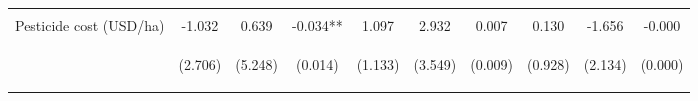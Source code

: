 \begin{center}
\begin{tabular}{lccccccccc}
\vspace{4pt} & \begin{footnotesize}[0.231]\end{footnotesize} & \begin{footnotesize}[0.617]\end{footnotesize} & \begin{footnotesize}[0.990]\end{footnotesize} & \begin{footnotesize}[0.689]\end{footnotesize} & \begin{footnotesize}[0.001]\end{footnotesize} & \begin{footnotesize}[0.008]\end{footnotesize} & \begin{footnotesize}[0.866]\end{footnotesize} & \begin{footnotesize}[0.000]\end{footnotesize} & \begin{footnotesize}[0.344]\end{footnotesize} \\
Pesticide cost (USD/ha) & -1.032 & 0.639 & -0.034** & 1.097 & 2.932 & 0.007 & 0.130 & -1.656 & -0.000 \\
 & \begin{footnotesize}(2.706)\end{footnotesize} & \begin{footnotesize}(5.248)\end{footnotesize} & \begin{footnotesize}(0.014)\end{footnotesize} & \begin{footnotesize}(1.133)\end{footnotesize} & \begin{footnotesize}(3.549)\end{footnotesize} & \begin{footnotesize}(0.009)\end{footnotesize} & \begin{footnotesize}(0.928)\end{footnotesize} & \begin{footnotesize}(2.134)\end{footnotesize} & \begin{footnotesize}(0.000)\end{footnotesize} \\

\end{tabular}
\end{center}
